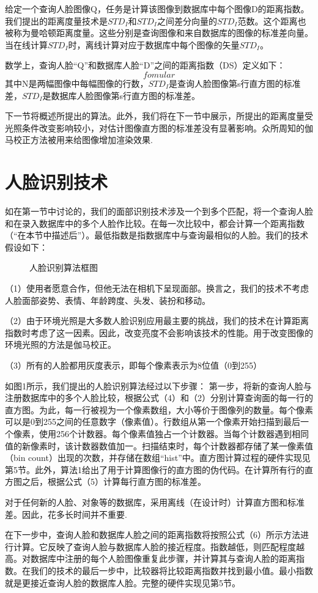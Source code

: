 给定一个查询人脸图像Q，任务是计算该图像到数据库中每个图像D的距离指数。我们提出的距离度量技术是$STD_I$和$STD_I$之间差分向量的$STD_I$范数。这个距离也被称为曼哈顿距离度量。这些分别是查询图像和来自数据库的图像的标准差向量。当在线计算$STD_I$时，离线计算对应于数据库中每个图像的矢量$STD_I$。

数学上，查询人脸“Q”和数据库人脸“D”之间的距离指数（DS）定义如下：
\begin{equation}
fomular
\end{equation}
其中N是两幅图像中每幅图像的行数，$STD_I$是查询人脸图像第s行直方图的标准差，$STD_I$是数据库人脸图像第s行直方图的标准差。

下一节将概述所提出的算法。此外，我们将在下一节中展示，所提出的距离度量受光照条件改变影响较小，对估计图像直方图的标准差没有显著影响。众所周知的伽马校正方法被用来给图像增加渲染效果.
\section{人脸识别技术}
如在第一节中讨论的，我们的面部识别技术涉及一个到多个匹配，将一个查询人脸和在录入数据库中的多个人脸作比较。在每一次比较中，都会计算一个距离指数（“在本节中描述后”）。最低指数是指数据库中与查询最相似的人脸。我们的技术假设如下：
\begin{figure}
	\centering
	\caption{\song\wuhao 人脸识别算法框图}

\end{figure}
（1）使用者愿意合作，但他无法在相机下呈现面部。换言之，我们的技术不考虑人脸面部姿势、表情、年龄跨度、头发、装扮和移动。

（2）由于环境光照是大多数人脸识别应用最主要的挑战，我们的技术在计算距离指数时考虑了这一因素。因此，改变亮度不会影响该技术的性能。用于改变图像的环境光照的方法是伽马校正。

（3）所有的人脸都用灰度表示，即每个像素表示为8位值（0到255）

如图1所示，我们提出的人脸识别算法经过以下步骤：
第一步，将新的查询人脸与注册数据库中的多个人脸比较，根据公式（4）和（2）分别计算查询面的每一行的直方图。为此，每一行被视为一个像素数组，大小等价于图像列的数量。每个像素可以是0到255之间的任意数字（像素值）。行数组从第一个像素开始扫描到最后一个像素，使用256个计数器。每个像素值独占一个计数器。当每个计数器遇到相同值的新像素时，该计数器数值加一。扫描结束时，每个计数器都存储了某一像素值（bin count）出现的次数，并存储在数组“hist”中。直方图计算过程的硬件实现见第5节。此外，算法1给出了用于计算图像行的直方图的伪代码。在计算所有行的直方图之后，根据公式（5）计算每行直方图的标准差。

对于任何新的人脸、对象等的数据库，采用离线（在设计时）计算直方图和标准差。因此，花多长时间并不重要.

在下一步中，查询人脸和数据库人脸之间的距离指数将按照公式（6）所示方法进行计算。它反映了查询人脸与数据库人脸的接近程度。指数越低，则匹配程度越高。对数据库中注册的每个人脸图像重复此步骤，并计算其与查询人脸的距离指数。在我们的技术的最后一步中，比较器将比较距离指数并找到最小值。最小指数就是更接近查询人脸的数据库人脸。完整的硬件实现见第5节。

